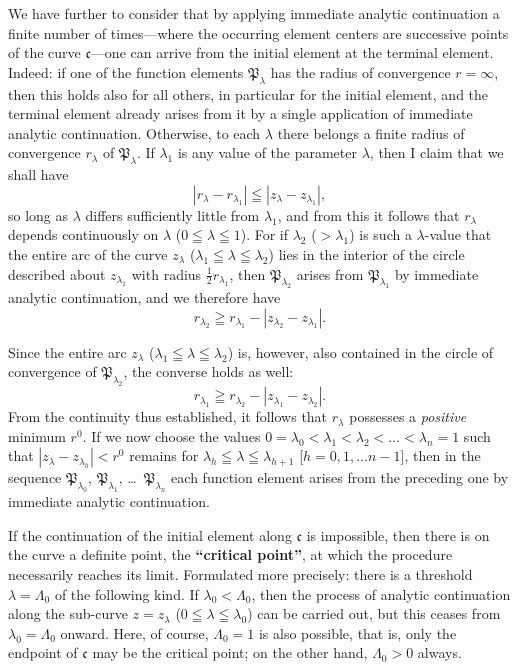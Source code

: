\documentclass{article}
\begin{document}
We have further to consider that by applying immediate analytic continuation a finite number of times---where the occurring element centers are successive points of the curve $\mathfrak{c}$---one can arrive from the initial element at the terminal element. Indeed: if one of the function elements $\mathfrak{P}_\lambda$ has the radius of convergence $r = \infty$, then this holds also for all others, in particular for the initial element, and the terminal element already arises from it by a single application of immediate analytic continuation. Otherwise, to each $\lambda$ there belongs a finite radius of convergence $r_\lambda$ of $\mathfrak{P}_\lambda$. If $\lambda_1$ is any value of the parameter $\lambda$, then I claim that we shall have
\[ |r_\lambda - r_{\lambda_1}| \leqq |z_\lambda - z_{\lambda_1}|, \]
so long as $\lambda$ differs sufficiently little from $\lambda_1$, and from this it follows that $r_\lambda$ depends continuously on $\lambda$ ($0 \leqq \lambda \leqq 1$). For if $\lambda_2$ ($> \lambda_1$) is such a $\lambda$-value that the entire arc of the curve $z_\lambda$ ($\lambda_1 \leqq \lambda \leqq \lambda_2$) lies in the interior of the circle described about $z_{\lambda_1}$ with radius $\frac{1}{2}r_{\lambda_1}$, then $\mathfrak{P}_{\lambda_2}$ arises from $\mathfrak{P}_{\lambda_1}$ by immediate analytic continuation, and we therefore have
\[ r_{\lambda_2} \geqq r_{\lambda_1} - |z_{\lambda_2} - z_{\lambda_1}|. \]

Since the entire arc $z_\lambda$ ($\lambda_1 \leqq \lambda \leqq \lambda_2$) is, however, also contained in the circle of convergence of $\mathfrak{P}_{\lambda_2}$, the converse holds as well:
\[ r_{\lambda_1} \geqq r_{\lambda_2} - |z_{\lambda_1} - z_{\lambda_2}|. \]
From the continuity thus established, it follows that $r_\lambda$ possesses a \emph{positive} minimum $r^0$. If we now choose the values $0 = \lambda_0 < \lambda_1 < \lambda_2 < \dots < \lambda_n = 1$ such that $|z_\lambda - z_{\lambda_h}| < r^0$ remains for $\lambda_h \leqq \lambda \leqq \lambda_{h+1}$ [$h = 0, 1, \dots n-1$], then in the sequence $\mathfrak{P}_{\lambda_0}$, $\mathfrak{P}_{\lambda_1}$, \dots\ $\mathfrak{P}_{\lambda_n}$ each function element arises from the preceding one by immediate analytic continuation.

If the continuation of the initial element along $\mathfrak{c}$ is impossible, then there is on the curve a definite point, the \textbf{``critical point''}, at which the procedure necessarily reaches its limit. Formulated more precisely: there is a threshold $\lambda = \Lambda_0$ of the following kind. If $\lambda_0 < \Lambda_0$, then the process of analytic continuation along the sub-curve $z = z_\lambda$ ($0 \leqq \lambda \leqq \lambda_0$) can be carried out, but this ceases from $\lambda_0 = \Lambda_0$ onward. Here, of course, $\Lambda_0 = 1$ is also possible, that is, only the endpoint of $\mathfrak{c}$ may be the critical point; on the other hand, $\Lambda_0 > 0$ always.
\end{document}

